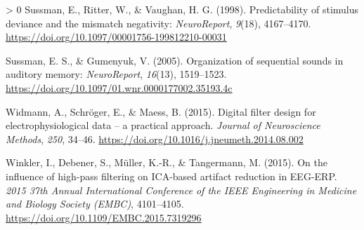 \documentclass[stu,a4paper,12pt, nofontenc, babel, american]{apa7}
\newlength{\cslhangindent}
\newenvironment{CSLReferences}[3] %
 {%
  \setlength{\parindent}{0pt}
  \ifodd #1 \everypar{\setlength{\hangindent}{\cslhangindent}}\ignorespaces\fi
  \ifnum #2 > 0
  \setlength{\parskip}{#3\baselineskip}
  \fi
 }%
 {}
\begin{document}
\begin{CSLReferences}{1}{0}
\leavevmode\hypertarget{ref-sussmanPredictabilityStimulusDeviance1998}{}%
Sussman, E., Ritter, W., \& Vaughan, H. G. (1998). Predictability of
stimulus deviance and the mismatch negativity: \emph{NeuroReport},
\emph{9}(18), 4167--4170.
\url{https://doi.org/10.1097/00001756-199812210-00031}

\leavevmode\hypertarget{ref-sussmanOrganizationSequentialSounds2005}{}%
Sussman, E. S., \& Gumenyuk, V. (2005). Organization of sequential
sounds in auditory memory: \emph{NeuroReport}, \emph{16}(13),
1519--1523. \url{https://doi.org/10.1097/01.wnr.0000177002.35193.4c}

\leavevmode\hypertarget{ref-widmannDigitalFilterDesign2015}{}%
Widmann, A., Schröger, E., \& Maess, B. (2015). Digital filter design
for electrophysiological data -- a practical approach. \emph{Journal of
Neuroscience Methods}, \emph{250}, 34--46.
\url{https://doi.org/10.1016/j.jneumeth.2014.08.002}

\leavevmode\hypertarget{ref-winklerInfluenceHighpassFiltering2015}{}%
Winkler, I., Debener, S., Müller, K.-R., \& Tangermann, M. (2015). On
the influence of high-pass filtering on ICA-based artifact reduction in
EEG-ERP. \emph{2015 37th Annual International Conference of the IEEE
Engineering in Medicine and Biology Society (EMBC)}, 4101--4105.
\url{https://doi.org/10.1109/EMBC.2015.7319296}

\end{CSLReferences}
\end{document}

